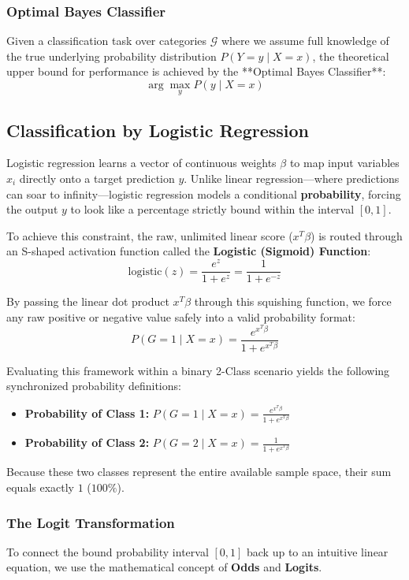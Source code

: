\documentclass{article}
\begin{document}
\subsubsection{Optimal Bayes Classifier}
Given a classification task over categories $\mathcal{G}$ where we assume full knowledge of the true underlying probability distribution $P(Y = y \mid X = x)$, the theoretical upper bound for performance is achieved by the **Optimal Bayes Classifier**:
\[ \arg\max_y P(y \mid X = x) \]

\subsection{Classification by Logistic Regression}
Logistic regression learns a vector of continuous weights $\beta$ to map input variables $x_i$ directly onto a target prediction $y$. Unlike linear regression—where predictions can soar to infinity—logistic regression models a conditional \textbf{probability}, forcing the output $y$ to look like a percentage strictly bound within the interval $[0, 1]$.

To achieve this constraint, the raw, unlimited linear score ($x^T\beta$) is routed through an S-shaped activation function called the \textbf{Logistic (Sigmoid) Function}:
\[ \text{logistic}(z) = \frac{e^z}{1 + e^z} = \frac{1}{1 + e^{-z}} \]



By passing the linear dot product $x^T\beta$ through this squishing function, we force any raw positive or negative value safely into a valid probability format:
\[ P(G = 1 \mid X = x) = \frac{e^{x^T\beta}}{1 + e^{x^T\beta}} \]

Evaluating this framework within a binary 2-Class scenario yields the following synchronized probability definitions:
\begin{itemize}
  \item \textbf{Probability of Class 1:} $P(G = 1 \mid X = x) = \frac{e^{x^T\beta}}{1 + e^{x^T\beta}}$
  \item \textbf{Probability of Class 2:} $P(G = 2 \mid X = x) = \frac{1}{1 + e^{x^T\beta}}$
\end{itemize}
Because these two classes represent the entire available sample space, their sum equals exactly $1$ ($100\%$).

\subsubsection{The Logit Transformation }
To connect the bound probability interval $[0,1]$ back up to an intuitive linear equation, we use the mathematical concept of \textbf{Odds} and \textbf{Logits}.
\end{document}
